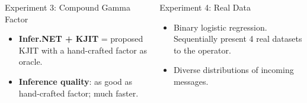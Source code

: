 \documentclass[english]{beamer}
\begin{document}
\begin{frame}
\begin{columns}[t]
\begin{block}{ Experiment 3: Compound Gamma Factor }
\vspace{5mm}

\begin{itemize}
    \item \textbf{Infer.NET + KJIT} = proposed KJIT with a hand-crafted factor as oracle.
    \item \textbf{Inference quality}: as good as hand-crafted factor; much faster.
\end{itemize}
\end{block}

\begin{block}{ Experiment 4: Real Data}
\begin{itemize}
    \item Binary logistic regression.  Sequentially present 4 real datasets
        to the operator.
    \item Diverse distributions of incoming messages.
\end{itemize}

\begin{figure}[ht]
  \centering
  \hspace{5mm}
  \hspace{5mm}
  \label{fig:uci_performance}
\end{figure}


\end{block}
\end{columns}
\end{frame}
\end{document}
